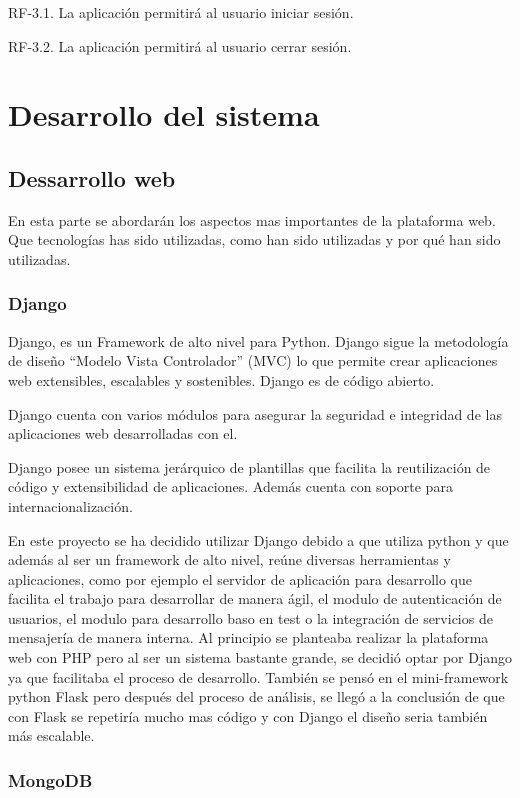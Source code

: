 \documentclass[a4paper,11pt]{book}
\begin{document}
	RF-3.1. La aplicación permitirá al usuario iniciar sesión.
	
	RF-3.2. La aplicación permitirá al usuario cerrar sesión.



\chapter{Desarrollo del sistema}

\section{Dessarrollo web}
En esta parte se abordarán los aspectos mas importantes de la plataforma web. Que tecnologías has sido utilizadas, como han sido utilizadas y por qué han sido utilizadas.

\subsection{Django}
Django\cite{dj}, es un Framework de alto nivel para Python. Django sigue la metodología de diseño “Modelo Vista Controlador” (MVC) lo que permite crear aplicaciones web extensibles, escalables y sostenibles. Django es de código abierto. 

Django cuenta con varios módulos para asegurar la seguridad e integridad de las aplicaciones web desarrolladas con el. 

Django posee un sistema jerárquico de plantillas que facilita la reutilización de código y extensibilidad de aplicaciones. Además cuenta con soporte para internacionalización.

En este proyecto se ha decidido utilizar Django debido a que utiliza python y que además al ser un framework de alto nivel, reúne diversas herramientas y aplicaciones, como por ejemplo el servidor de aplicación para desarrollo que facilita el trabajo para desarrollar de manera ágil, el modulo de autenticación de usuarios, el modulo para desarrollo baso en test o la integración de servicios de mensajería de manera interna. Al principio se planteaba realizar la plataforma web con PHP pero al ser un sistema bastante grande, se decidió optar por Django ya que facilitaba el proceso de desarrollo. También se pensó en el mini-framework python Flask pero después del proceso de análisis, se llegó a la conclusión de que con Flask se repetiría mucho mas código y con Django el diseño seria también más escalable.

\subsection{MongoDB}
\end{document}
